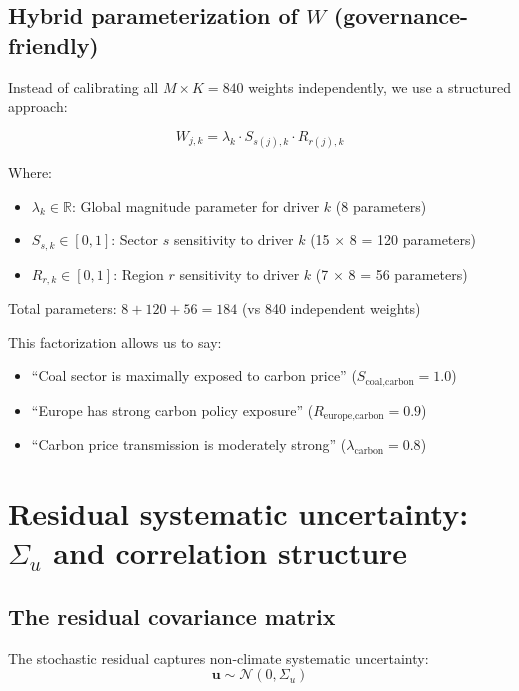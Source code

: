 \documentclass[11pt,a4paper]{article}
\begin{document}
\subsection{Hybrid parameterization of $W$ (governance-friendly)}

Instead of calibrating all $M \times K = 840$ weights independently, we use a structured approach:

\begin{equation}
W_{j,k} = \lambda_k \cdot S_{s(j),k} \cdot R_{r(j),k}
\end{equation}

Where:
\begin{itemize}
    \item $\lambda_k \in \mathbb{R}$: Global magnitude parameter for driver $k$ (8 parameters)
    \item $S_{s,k} \in [0,1]$: Sector $s$ sensitivity to driver $k$ (15 $\times$ 8 = 120 parameters)
    \item $R_{r,k} \in [0,1]$: Region $r$ sensitivity to driver $k$ (7 $\times$ 8 = 56 parameters)
\end{itemize}

Total parameters: $8 + 120 + 56 = 184$ (vs 840 independent weights)

This factorization allows us to say:
\begin{itemize}
    \item ``Coal sector is maximally exposed to carbon price'' ($S_{\text{coal,carbon}} = 1.0$)
    \item ``Europe has strong carbon policy exposure'' ($R_{\text{europe,carbon}} = 0.9$)
    \item ``Carbon price transmission is moderately strong'' ($\lambda_{\text{carbon}} = 0.8$)
\end{itemize}

\section{Residual systematic uncertainty: $\Sigma_u$ and correlation structure}

\subsection{The residual covariance matrix}

The stochastic residual captures non-climate systematic uncertainty:
\begin{equation}
\mathbf{u} \sim \mathcal{N}(0, \Sigma_u)
\end{equation}
\end{document}

